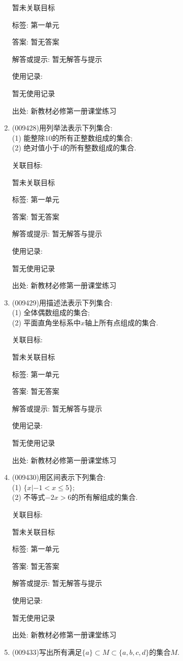 \documentclass[10pt,a4paper]{article}
\begin{document}
\begin{enumerate}[1.]
暂未关联目标



标签: 第一单元

答案: 暂无答案

解答或提示: 暂无解答与提示

使用记录:

暂无使用记录


出处: 新教材必修第一册课堂练习
\item { (009428)}用列举法表示下列集合:\\
(1) 能整除$10$的所有正整数组成的集合;\\
(2) 绝对值小于$4$的所有整数组成的集合.


关联目标:

暂未关联目标



标签: 第一单元

答案: 暂无答案

解答或提示: 暂无解答与提示

使用记录:

暂无使用记录


出处: 新教材必修第一册课堂练习
\item { (009429)}用描述法表示下列集合:\\
(1) 全体偶数组成的集合;\\
(2) 平面直角坐标系中$x$轴上所有点组成的集合.


关联目标:

暂未关联目标



标签: 第一单元

答案: 暂无答案

解答或提示: 暂无解答与提示

使用记录:

暂无使用记录


出处: 新教材必修第一册课堂练习
\item { (009430)}用区间表示下列集合:\\
(1) $\{x|-1<x\le 5\}$;\\
(2) 不等式$-2x>6$的所有解组成的集合.


关联目标:

暂未关联目标



标签: 第一单元

答案: 暂无答案

解答或提示: 暂无解答与提示

使用记录:

暂无使用记录


出处: 新教材必修第一册课堂练习
\item { (009433)}写出所有满足$\{a\}\subset M\subset \{a, b, c, d\}$的集合$M$.



\end{enumerate}
\end{document}
